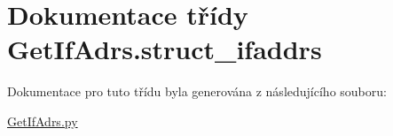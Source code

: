 \hypertarget{classGetIfAdrs_1_1struct__ifaddrs}{\section{Dokumentace třídy Get\-If\-Adrs.\-struct\-\_\-ifaddrs}
\label{dc/dd7/classGetIfAdrs_1_1struct__ifaddrs}
}


Dokumentace pro tuto třídu byla generována z následujícího souboru\-:\begin{DoxyCompactItemize}
\item 
\hyperlink{GetIfAdrs_8py}{Get\-If\-Adrs.\-py}\end{DoxyCompactItemize}

